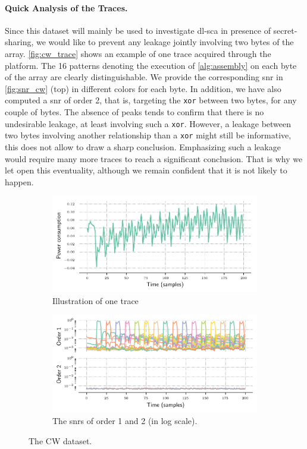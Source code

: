\paragraph{Quick Analysis of the Traces.}
Since this dataset will mainly be used to investigate \gls{dl}-\gls{sca} in presence of secret-sharing, we would like to prevent any leakage jointly involving two bytes of the array.
\autoref{fig:cw_trace} shows an example of one trace acquired through the platform.
The 16 patterns denoting the execution of \autoref{alg:assembly} on each byte of the array are clearly distinguishable.
We provide the corresponding \gls{snr} in \autoref{fig:snr_cw} (top) in different colors for each byte.
In addition, we have also computed a \gls{snr} of order 2, that is, targeting the \verb+xor+ between two bytes, for any couple of bytes.
The absence of peaks tends to confirm that there is no undesirable leakage, at least involving such a \verb+xor+.
However, a leakage between two bytes involving another relationship than a \verb+xor+ might still be informative, this does not allow to draw a sharp conclusion.
Emphasizing such a leakage would require many more traces to reach a significant conclusion.
That is why we let open this eventuality, although we remain confident that it is not likely to happen.
\begin{figure}[ht]
    \centering
    \begin{subfigure}{\textwidth}
        \includegraphics[width=\textwidth]{CW-dataset/exp_trace}
        \caption{Illustration of one trace}
        \label{fig:cw_trace}
    \end{subfigure}
    \begin{subfigure}{\textwidth}
        \includegraphics[width=\textwidth]{CW-dataset/snr_reduce.png}
        \caption{The \glspl{snr} of order 1 and 2 (in log scale).}
    \end{subfigure}
    \caption{The CW dataset.}
    \label{fig:snr_cw}
\end{figure}

